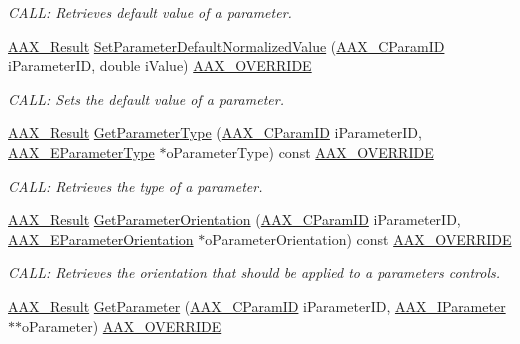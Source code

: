 \begin{Indent}
\begin{DoxyCompactItemize}
\begin{DoxyCompactList}\small\item\em C\+A\+LL\+: Retrieves default value of a parameter. \end{DoxyCompactList}\item 
\mbox{\hyperlink{a00392_a4d8f69a697df7f70c3a8e9b8ee130d2f}{A\+A\+X\+\_\+\+Result}} \mbox{\hyperlink{a01481_aafbafbc1b07c3f41c40b2ff9820557c8}{Set\+Parameter\+Default\+Normalized\+Value}} (\mbox{\hyperlink{a00392_a1440c756fe5cb158b78193b2fc1780d1}{A\+A\+X\+\_\+\+C\+Param\+ID}} i\+Parameter\+ID, double i\+Value) \mbox{\hyperlink{a00392_ac2f24a5172689ae684344abdcce55463}{A\+A\+X\+\_\+\+O\+V\+E\+R\+R\+I\+DE}}
\begin{DoxyCompactList}\small\item\em C\+A\+LL\+: Sets the default value of a parameter. \end{DoxyCompactList}\item 
\mbox{\hyperlink{a00392_a4d8f69a697df7f70c3a8e9b8ee130d2f}{A\+A\+X\+\_\+\+Result}} \mbox{\hyperlink{a01481_a95c40a67ef6cd5e830e46826d1ccf5c4}{Get\+Parameter\+Type}} (\mbox{\hyperlink{a00392_a1440c756fe5cb158b78193b2fc1780d1}{A\+A\+X\+\_\+\+C\+Param\+ID}} i\+Parameter\+ID, \mbox{\hyperlink{a00491_a4cd0f189daa9a60cf36883c56344bb2e}{A\+A\+X\+\_\+\+E\+Parameter\+Type}} $\ast$o\+Parameter\+Type) const \mbox{\hyperlink{a00392_ac2f24a5172689ae684344abdcce55463}{A\+A\+X\+\_\+\+O\+V\+E\+R\+R\+I\+DE}}
\begin{DoxyCompactList}\small\item\em C\+A\+LL\+: Retrieves the type of a parameter. \end{DoxyCompactList}\item 
\mbox{\hyperlink{a00392_a4d8f69a697df7f70c3a8e9b8ee130d2f}{A\+A\+X\+\_\+\+Result}} \mbox{\hyperlink{a01481_a8ddd81b155f01497508093d32f5545e7}{Get\+Parameter\+Orientation}} (\mbox{\hyperlink{a00392_a1440c756fe5cb158b78193b2fc1780d1}{A\+A\+X\+\_\+\+C\+Param\+ID}} i\+Parameter\+ID, \mbox{\hyperlink{a00491_a52f91d1c14aa5dceedabfb9d2de31bf0}{A\+A\+X\+\_\+\+E\+Parameter\+Orientation}} $\ast$o\+Parameter\+Orientation) const \mbox{\hyperlink{a00392_ac2f24a5172689ae684344abdcce55463}{A\+A\+X\+\_\+\+O\+V\+E\+R\+R\+I\+DE}}
\begin{DoxyCompactList}\small\item\em C\+A\+LL\+: Retrieves the orientation that should be applied to a parameter\textquotesingle{}s controls. \end{DoxyCompactList}\item 
\mbox{\hyperlink{a00392_a4d8f69a697df7f70c3a8e9b8ee130d2f}{A\+A\+X\+\_\+\+Result}} \mbox{\hyperlink{a01481_a0fc56336535ca545f1844a5497eecc64}{Get\+Parameter}} (\mbox{\hyperlink{a00392_a1440c756fe5cb158b78193b2fc1780d1}{A\+A\+X\+\_\+\+C\+Param\+ID}} i\+Parameter\+ID, \mbox{\hyperlink{a01857}{A\+A\+X\+\_\+\+I\+Parameter}} $\ast$$\ast$o\+Parameter) \mbox{\hyperlink{a00392_ac2f24a5172689ae684344abdcce55463}{A\+A\+X\+\_\+\+O\+V\+E\+R\+R\+I\+DE}}
$$
\end{DoxyCompactItemize}
\end{Indent}
